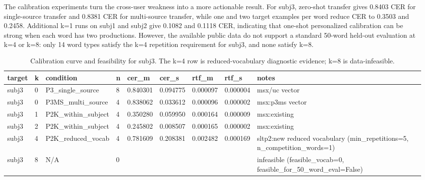 The calibration experiments turn the cross-user weakness into a more actionable result. For subj3, zero-shot transfer gives 0.8403 CER for single-source transfer and 0.8381 CER for multi-source transfer, while one and two target examples per word reduce CER to 0.3503 and 0.2458. Additional k=1 runs on subj1 and subj2 give 0.1082 and 0.1118 CER, indicating that one-shot personalized calibration can be strong when each word has two productions. However, the available public data do not support a standard 50-word held-out evaluation at k=4 or k=8: only 14 word types satisfy the k=4 repetition requirement for subj3, and none satisfy k=8.


\begin{table}[t]
\centering
\caption{Calibration curve and feasibility for subj3. The k=4 row is reduced-vocabulary diagnostic evidence; k=8 is data-infeasible.}
\label{tab:kshot_curve}
\begin{tabular}{lllllllll}
\hline
target & k & condition & n & cer_m & cer_s & rtf_m & rtf_s & notes \\
\hline
subj3 & 0 & P3_single_source & 8 & 0.840301 & 0.094775 & 0.000097 & 0.000004 & msx/uc vector \\
subj3 & 0 & P3MS_multi_source & 4 & 0.838062 & 0.033612 & 0.000096 & 0.000002 & msx:p3ms vector \\
subj3 & 1 & P2K_within_subject & 4 & 0.350280 & 0.059950 & 0.000164 & 0.000009 & msx:existing \\
subj3 & 2 & P2K_within_subject & 4 & 0.245802 & 0.008507 & 0.000165 & 0.000002 & msx:existing \\
subj3 & 4 & P2K_reduced_vocab & 4 & 0.781609 & 0.208381 & 0.002482 & 0.000169 & sltp2:new reduced vocabulary (min_repetitions=5, n_competition_words=1) \\
subj3 & 8 & N/A & 0 &  &  &  &  & infeasible (feasible_vocab=0, feasible_for_50_word_eval=False) \\
\hline
\end{tabular}
\end{table}

